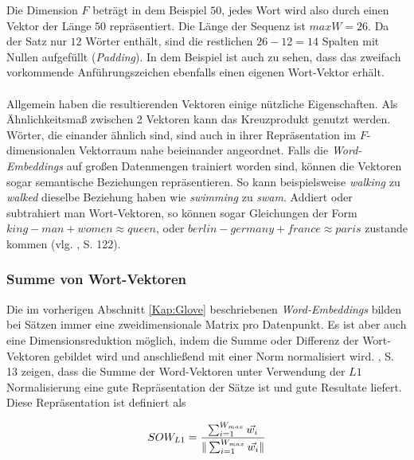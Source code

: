 \documentclass[a4paper,11pt]{article}
\begin{document}
Die Dimension $F$ beträgt in dem Beispiel $50$, jedes Wort wird also durch einen Vektor der Länge $50$ repräsentiert. Die Länge der Sequenz ist $maxW = 26$. Da der Satz nur $12$ Wörter enthält, sind die restlichen $26-12 = 14$ Spalten mit Nullen aufgefüllt (\textit{Padding}). In dem Beispiel ist auch zu sehen, dass das zweifach vorkommende Anführungszeichen  ebenfalls einen eigenen Wort-Vektor erhält.\\
\\
Allgemein haben die resultierenden Vektoren einige nützliche Eigenschaften. Als Ähnlichkeits\-maß zwischen 2 Vektoren kann das Kreuzprodukt genutzt werden. Wörter, die einander ähnlich sind, sind auch in ihrer Repräsentation im $F$-dimensionalen Vektorraum nahe beieinander angeordnet. Falls die \textit{Word-Embeddings} auf großen Datenmengen trainiert worden sind, können die Vektoren sogar semantische Beziehungen repräsentieren. So kann beispielsweise \textit{walking} zu \textit{walked} dieselbe Beziehung haben wie \textit{swimming} zu \textit{swam}. Addiert oder subtrahiert man Wort-Vektoren, so können sogar Gleichungen der Form $king - man + women \approx queen$, oder $berlin - germany + france \approx paris$ zustande kommen (vlg. \cite{deepEssentials}, S. 122).

\subsubsection{Summe von Wort-Vektoren}

Die im vorherigen Abschnitt \ref{Kap:Glove} beschriebenen \textit{Word-Embeddings} bilden bei Sätzen immer eine zweidimensionale Matrix pro Datenpunkt. Es ist aber auch eine Dimensionsreduktion möglich, indem die Summe oder Differenz der Wort-Vektoren gebildet wird und anschließend mit einer Norm normalisiert wird. \cite{sumsWords}, S. 13 zeigen,
dass die Summe der Word-Vektoren unter Verwendung der $L1$ Normalisierung eine gute Repräsentation der Sätze ist und gute Resultate liefert. Diese Repräsentation ist definiert als

\[SOW_{L1} = \frac{\sum_{i=1}^{W_{max}} \Vec{w_i}}{\| \sum_{i=1}^{W_{max}}  \vec{w_i} \|} \vspace{0.2cm}\]
\end{document}
